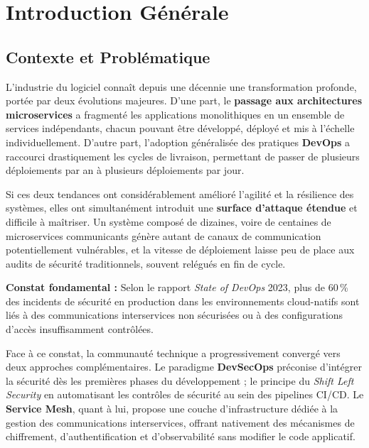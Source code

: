 \chapter*{Introduction Générale}

\section*{Contexte et Problématique}

L'industrie du logiciel connaît depuis une décennie une transformation profonde,
portée par deux évolutions majeures. D'une part, le \textbf{passage aux architectures
microservices} a fragmenté les applications monolithiques en un ensemble de services
indépendants, chacun pouvant être développé, déployé et mis à l'échelle
individuellement. D'autre part, l'adoption généralisée des pratiques
\textbf{DevOps} a raccourci drastiquement les cycles de livraison, permettant de
passer de plusieurs déploiements par an à plusieurs déploiements par jour.

Si ces deux tendances ont considérablement amélioré l'agilité et la résilience des
systèmes, elles ont simultanément introduit une \textbf{surface d'attaque étendue}
et difficile à maîtriser. Un système composé de dizaines, voire de centaines de
microservices communicants génère autant de canaux de communication potentiellement
vulnérables, et la vitesse de déploiement laisse peu de place aux audits de sécurité
traditionnels, souvent relégués en fin de cycle.


  \textbf{Constat fondamental :} Selon le rapport \textit{State of DevOps} 2023,
  plus de 60\,\% des incidents de sécurité en production dans les environnements
  cloud-natifs sont liés à des communications interservices non sécurisées ou à
  des configurations d'accès insuffisamment contrôlées.


Face à ce constat, la communauté technique a progressivement convergé vers deux
approches complémentaires. Le paradigme \textbf{DevSecOps} préconise d'intégrer
la sécurité dès les premières phases du développement ; le principe du
\textit{Shift Left Security} en automatisant les contrôles de sécurité au sein
des pipelines CI/CD. Le \textbf{Service Mesh}, quant à lui, propose une couche
d'infrastructure dédiée à la gestion des communications interservices, offrant
nativement des mécanismes de chiffrement, d'authentification et d'observabilité
sans modifier le code applicatif.

